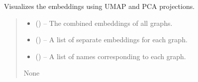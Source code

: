 \documentclass[letterpaper,10pt,english]{sphinxhowto}
\begin{document}
\begin{fulllineitems}
\begin{fulllineitems}
\label{\detokenize{top:id4}}
\pysigstartsignatures
{}
\pysigstopsignatures
\sphinxAtStartPar
Visualizes the embeddings using UMAP and PCA projections.
\begin{quote}\begin{description}
\begin{itemize}
\item {} 
\sphinxAtStartPar
{} () – The combined embeddings of all graphs.

\item {} 
\sphinxAtStartPar
{} () – A list of separate embeddings for each graph.

\item {} 
\sphinxAtStartPar
{} () – A list of names corresponding to each graph.

\end{itemize}

\sphinxAtStartPar
None

\end{description}\end{quote}

\end{fulllineitems}


\end{fulllineitems}

\end{document}
